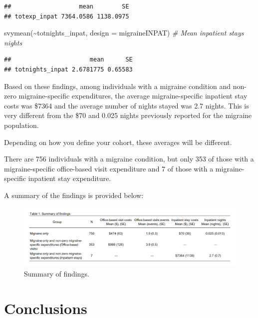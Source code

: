 \documentclass[
]{book}
\newenvironment{Shaded}{\begin{snugshade}}{\end{snugshade}}
\newcommand{\AttributeTok}[1]{\textcolor[rgb]{0.77,0.63,0.00}{#1}}
\newcommand{\CommentTok}[1]{\textcolor[rgb]{0.56,0.35,0.01}{\textit{#1}}}
\newcommand{\FunctionTok}[1]{\textcolor[rgb]{0.00,0.00,0.00}{#1}}
\newcommand{\NormalTok}[1]{#1}
\newcommand{\SpecialCharTok}[1]{\textcolor[rgb]{0.00,0.00,0.00}{#1}}
\begin{document}
\begin{verbatim}
##                   mean        SE
## totexp_inpat 7364.0586 1138.0975
\end{verbatim}

\begin{Shaded}
\begin{Highlighting}[]
\FunctionTok{svymean}\NormalTok{(}\SpecialCharTok{\textasciitilde{}}\NormalTok{totnights\_inpat, }\AttributeTok{design =}\NormalTok{ migraineINPAT) }\CommentTok{\# Mean inpatient stays nights }
\end{Highlighting}
\end{Shaded}

\begin{verbatim}
##                      mean      SE
## totnights_inpat 2.6781775 0.65583
\end{verbatim}

Based on these findings, among individuals with a migraine condition and non-zero migraine-specific expenditures, the average migraine-specific inpatient stay costs was \$7364 and the average number of nights stayed was 2.7 nights. This is very different from the \$70 and 0.025 nights previously reported for the migraine population.

Depending on how you define your cohort, these averages will be different.

There are 756 individuals with a migraine condition, but only 353 of those with a migraine-specific office-based visit expenditure and 7 of those with a migraine-specific inpatient stay expenditure.

A summary of the findings is provided below:

\begin{figure}
\includegraphics[width=1\linewidth]{Figure 4_4} \caption{Summary of findings.}\label{fig:unnamed-chunk-61}
\end{figure}

\hypertarget{conclusions-3}{%
\section{Conclusions}\label{conclusions-3}}
\end{document}
